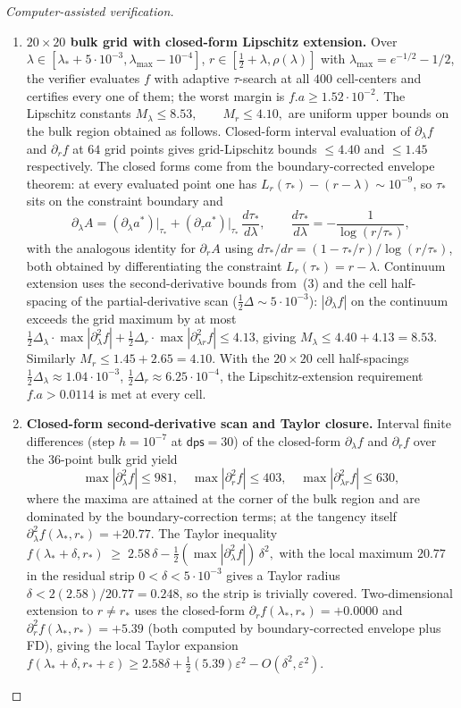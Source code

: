 \documentclass[11pt]{article}
\begin{document}
\begin{proof}[Computer-assisted verification]
\begin{enumerate}
\item \textbf{$20\times20$ bulk grid with closed-form Lipschitz
extension.} Over
$\lambda\in[\lambda_*+5\cdot10^{-3},\lambda_{\max}-10^{-4}]$,
$r\in[\tfrac12+\lambda,\rho(\lambda)]$ with $\lambda_{\max}=e^{-1/2}-1/2$,
the verifier evaluates $f$ with adaptive $\tau$-search at all $400$
cell-centers and certifies every one of them; the worst margin is
$f.a\geq 1.52\cdot 10^{-2}$. The Lipschitz constants
\(
        M_\lambda\le 8.53, \qquad M_r\le 4.10,
\)
are uniform upper bounds on the bulk region obtained as follows.
Closed-form interval evaluation of $\partial_\lambda f$ and
$\partial_r f$ at $64$ grid points gives grid-Lipschitz bounds
$\le 4.40$ and $\le 1.45$ respectively. The closed forms come from the
boundary-corrected envelope theorem: at every evaluated point one has
$L_r(\tau_*)-(r-\lambda)\sim 10^{-9}$, so $\tau_*$ sits on the
constraint boundary and
\[
        \partial_\lambda A
        = (\partial_\lambda a^*)\bigl|_{\tau_*}
        + (\partial_\tau a^*)\bigl|_{\tau_*}\,
          \frac{d\tau_*}{d\lambda},
        \qquad
        \frac{d\tau_*}{d\lambda} = -\frac{1}{\log(r/\tau_*)},
\]
with the analogous identity for $\partial_r A$ using
$d\tau_*/dr = (1-\tau_*/r)/\log(r/\tau_*)$, both obtained by
differentiating the constraint $L_r(\tau_*)=r-\lambda$. Continuum
extension uses the second-derivative bounds from~(3) and the cell
half-spacing of the partial-derivative scan
($\tfrac12 \Delta\sim 5\cdot10^{-3}$): $|\partial_\lambda f|$
on the continuum exceeds the grid maximum by at most
$\tfrac12 \Delta_\lambda\cdot\max|\partial^2_\lambda f|
+ \tfrac12 \Delta_r\cdot\max|\partial_{\lambda r}^2 f|\le 4.13$,
giving $M_\lambda\le 4.40+4.13=8.53$. Similarly
$M_r\le 1.45+2.65=4.10$. With the $20\times20$ cell half-spacings
$\tfrac12\Delta_\lambda\approx 1.04\cdot10^{-3}$,
$\tfrac12\Delta_r\approx 6.25\cdot10^{-4}$, the Lipschitz-extension
requirement $f.a > 0.0114$ is met at every cell.

\item \textbf{Closed-form second-derivative scan and Taylor closure.}
Interval finite differences (step $h=10^{-7}$ at $\textsf{dps}=30$) of
the closed-form $\partial_\lambda f$ and $\partial_r f$ over the
$36$-point bulk grid yield
\[
        \max|\partial^2_\lambda f|\le 981,\quad
        \max|\partial^2_r f|\le 403,\quad
        \max|\partial^2_{\lambda r} f|\le 630,
\]
where the maxima are attained at the corner of the bulk region and are
dominated by the boundary-correction terms; at the tangency itself
$\partial^2_\lambda f(\lambda_*,r_*)= +20.77$. The Taylor inequality
\(
        f(\lambda_*+\delta,r_*) \;\geq\; 2.58\,\delta
        - \tfrac12 (\max|\partial^2_\lambda f|)\,\delta^2,
\)
with the local maximum $20.77$ in the residual strip $0<\delta<5\cdot10^{-3}$
gives a Taylor radius $\delta<2(2.58)/20.77 = 0.248$, so the strip is
trivially covered. Two-dimensional extension to $r\neq r_*$ uses the
closed-form $\partial_r f(\lambda_*,r_*)=+0.0000$ and
$\partial^2_r f(\lambda_*,r_*)=+5.39$ (both computed by
boundary-corrected envelope plus FD), giving the local Taylor expansion
$f(\lambda_*+\delta,r_*+\varepsilon)
\geq 2.58\delta + \tfrac12 (5.39)\varepsilon^2 - O(\delta^2,\varepsilon^2)$.


\end{enumerate}
\end{proof}
\end{document}

